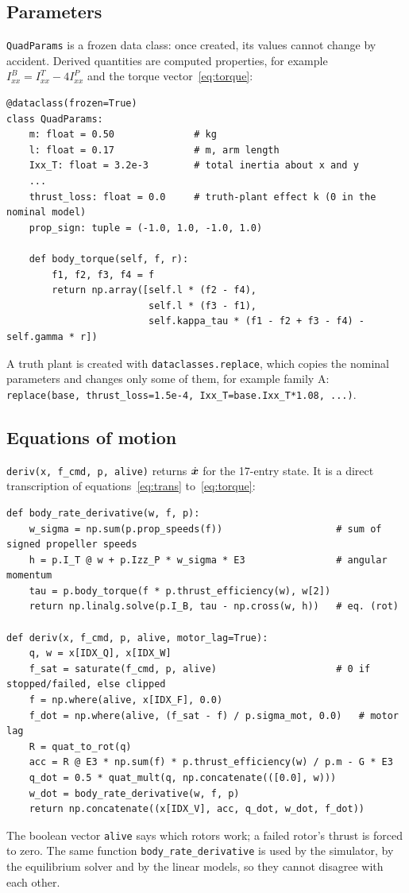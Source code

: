 \subsection{Parameters}
\texttt{QuadParams} is a frozen data class: once created, its values cannot change by accident. Derived quantities are computed properties, for example $I^B_{xx} = I^T_{xx} - 4I^P_{xx}$ and the torque vector~\eqref{eq:torque}:
\begin{lstlisting}
@dataclass(frozen=True)
class QuadParams:
    m: float = 0.50              # kg
    l: float = 0.17              # m, arm length
    Ixx_T: float = 3.2e-3        # total inertia about x and y
    ...
    thrust_loss: float = 0.0     # truth-plant effect k (0 in the nominal model)
    prop_sign: tuple = (-1.0, 1.0, -1.0, 1.0)

    def body_torque(self, f, r):
        f1, f2, f3, f4 = f
        return np.array([self.l * (f2 - f4),
                         self.l * (f3 - f1),
                         self.kappa_tau * (f1 - f2 + f3 - f4) - self.gamma * r])
\end{lstlisting}
A truth plant is created with \texttt{dataclasses.replace}, which copies the nominal parameters and changes only some of them, for example family A: \texttt{replace(base, thrust\_loss=1.5e-4, Ixx\_T=base.Ixx\_T*1.08, ...)}.

\subsection{Equations of motion}
\texttt{deriv(x, f\_cmd, p, alive)} returns $\dot{\boldsymbol{x}}$ for the 17-entry state. It is a direct transcription of equations~\eqref{eq:trans} to~\eqref{eq:torque}:
\begin{lstlisting}
def body_rate_derivative(w, f, p):
    w_sigma = np.sum(p.prop_speeds(f))                    # sum of signed propeller speeds
    h = p.I_T @ w + p.Izz_P * w_sigma * E3                # angular momentum
    tau = p.body_torque(f * p.thrust_efficiency(w), w[2])
    return np.linalg.solve(p.I_B, tau - np.cross(w, h))   # eq. (rot)

def deriv(x, f_cmd, p, alive, motor_lag=True):
    q, w = x[IDX_Q], x[IDX_W]
    f_sat = saturate(f_cmd, p, alive)                     # 0 if stopped/failed, else clipped
    f = np.where(alive, x[IDX_F], 0.0)
    f_dot = np.where(alive, (f_sat - f) / p.sigma_mot, 0.0)   # motor lag
    R = quat_to_rot(q)
    acc = R @ E3 * np.sum(f) * p.thrust_efficiency(w) / p.m - G * E3
    q_dot = 0.5 * quat_mult(q, np.concatenate(([0.0], w)))
    w_dot = body_rate_derivative(w, f, p)
    return np.concatenate((x[IDX_V], acc, q_dot, w_dot, f_dot))
\end{lstlisting}
The boolean vector \texttt{alive} says which rotors work; a failed rotor's thrust is forced to zero. The same function \texttt{body\_rate\_derivative} is used by the simulator, by the equilibrium solver and by the linear models, so they cannot disagree with each other.

